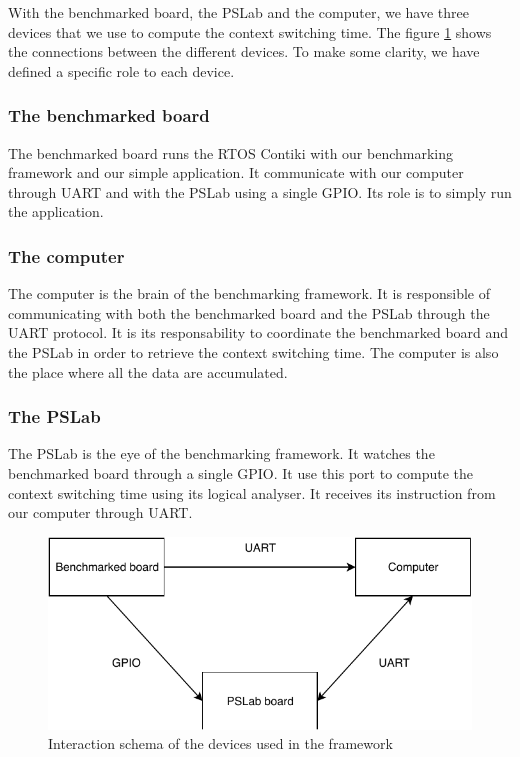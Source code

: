 With the benchmarked board, the PSLab and the computer, we have three devices that we use to compute the context switching time.
The figure \ref{fig:external-benchmarking-framework-schema} shows the connections between the different devices.
To make some clarity, we have defined a specific role to each device.

\subsubsection{The benchmarked board}
The benchmarked board runs the RTOS Contiki with our benchmarking framework and our simple application.
It communicate with our computer through UART and with the PSLab using a single GPIO.
Its role is to simply run the application.

\subsubsection{The computer}
The computer is the brain of the benchmarking framework.
It is responsible of communicating with both the benchmarked board and the PSLab through the UART protocol.
It is its responsability to coordinate the benchmarked board and the PSLab in order to retrieve the context switching time.
The computer is also the place where all the data are accumulated.

\subsubsection{The PSLab}
The PSLab is the eye of the benchmarking framework.
It watches the benchmarked board through a single GPIO.
It use this port to compute the context switching time using its logical analyser.
It receives its instruction from our computer through UART.

\begin{figure}[!ht]
  \centering
  \includegraphics[scale=1]{assets/external-benchmarking-framework-schema.pdf}
  \caption{\label{fig:external-benchmarking-framework-schema}Interaction schema of the devices used in the framework}
\end{figure}

